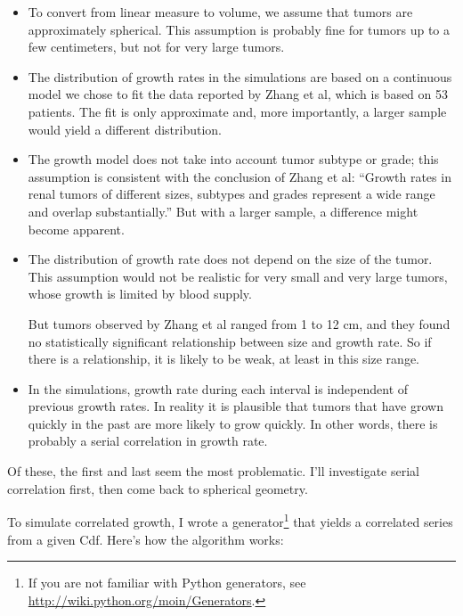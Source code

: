 \documentclass[12pt]{book}
\begin{document}
\begin{itemize}

\item To convert from linear measure to volume, we assume that
  tumors are approximately spherical.  This assumption is probably
  fine for tumors up to a few centimeters, but not for very
  large tumors.

\item The distribution of growth rates in the simulations are based on
  a continuous model we chose to fit the data reported by Zhang et al,
  which is based on 53 patients.  The fit is only approximate and, more
  importantly, a larger sample would yield a
  different distribution.

\item The growth model does not take into account tumor subtype or
  grade; this assumption is consistent with the conclusion of Zhang et al:
  ``Growth rates in renal tumors of different sizes, subtypes and
  grades represent a wide range and overlap substantially.''
  But with a larger sample, a difference might become apparent.

\item The distribution of growth rate does not depend on the size of
  the tumor.  This assumption would not be realistic for very
  small and very large tumors, whose growth is limited by blood supply.

  But tumors observed by Zhang et al ranged from 1 to 12 cm, and they
  found no statistically significant relationship between
  size and growth rate.  So if there is a relationship, it is
  likely to be weak, at least in this size range.
  
\item In the simulations, growth rate during each interval is
  independent of previous growth rates.  In reality it is plausible
  that tumors that have grown quickly in the past are more likely
  to grow quickly.  In other words, there is probably
  a serial correlation in growth rate.

\end{itemize}

Of these, the first and last seem the most problematic.  I'll
investigate serial correlation first, then come back to
spherical geometry.

To simulate correlated growth, I wrote a generator\footnote{If you are
  not familiar with Python generators, see
  \url{http://wiki.python.org/moin/Generators}.} that yields a
correlated series from a given Cdf.  Here's how the algorithm works:
\end{document}
